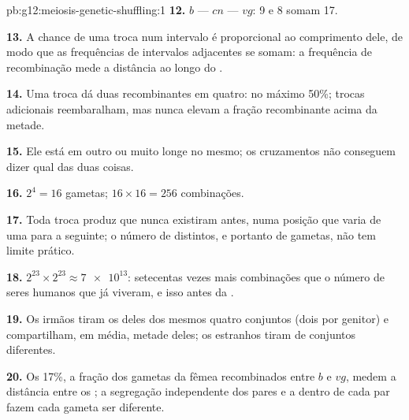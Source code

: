 \begin{solution}{pb:g12:meiosis-genetic-shuffling:1}
\textbf{12.} $b$ --- $cn$ --- $vg$: 9 e 8 somam 17.

\textbf{13.} A chance de uma troca num intervalo é proporcional ao
comprimento dele, de modo que as frequências de intervalos adjacentes
se somam: a frequência de recombinação mede a distância ao longo do
.

\textbf{14.} Uma troca dá duas  recombinantes em quatro: no
máximo 50\%; trocas adicionais reembaralham, mas nunca elevam a fração
recombinante acima da metade.

\textbf{15.} Ele está em outro  ou muito longe no mesmo; os
cruzamentos não conseguem dizer qual das duas coisas.

\textbf{16.} $2^4 = 16$ gametas; $16 \times 16 = 256$ combinações.

\textbf{17.} Toda troca produz  que nunca existiram antes,
numa posição que varia de uma  para a seguinte; o número de
 distintos, e portanto de gametas, não tem limite prático.

\textbf{18.} $2^{23} \times 2^{23} \approx \num{7e13}$: setecentas
vezes mais combinações que o número de seres humanos que já viveram, e
isso antes da .

\textbf{19.} Os irmãos tiram os  deles dos mesmos quatro
conjuntos (dois por genitor) e compartilham, em média, metade deles; os
estranhos tiram de conjuntos diferentes.

\textbf{20.} Os 17\%, a fração dos gametas da fêmea recombinados entre
$b$ e $vg$, medem a distância entre os ; a segregação independente
dos pares e a  dentro de cada par fazem cada gameta ser
diferente.
\end{solution}
